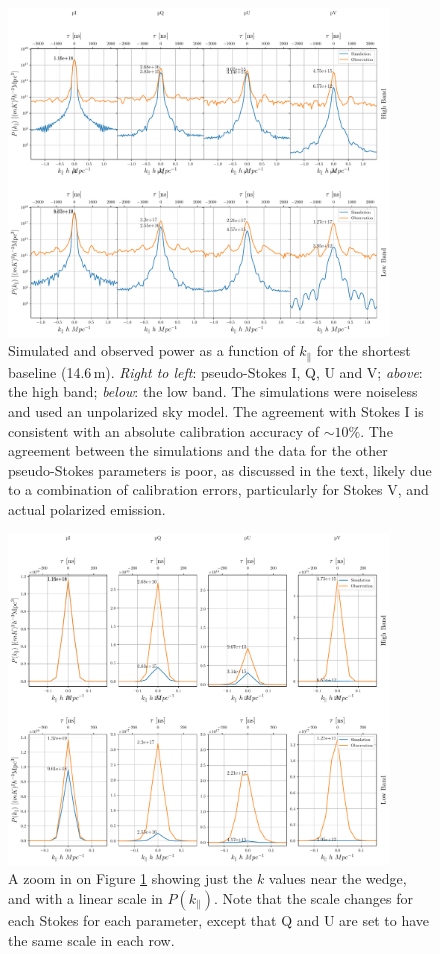 \documentclass[twocolumn, trackchanges]{aastex61}
\begin{document}
\begin{figure}[h]
\centering
\includegraphics[width=0.9\textwidth]{real_sim_compare_noinset.pdf}
\caption{Simulated and observed power as a function of $k_{\parallel}$ for the
  shortest baseline (14.6\,m). \textit{Right to left}: pseudo-Stokes I, Q, U and
  V; \textit{above}: the high band; \textit{below}: the low band. The
  simulations were noiseless and used an unpolarized sky model. The agreement
  with Stokes I is consistent with an absolute calibration accuracy of
  $\sim10\%$.  The agreement between the simulations and the data for the other
  pseudo-Stokes parameters is poor, as discussed in the text, likely due to a
  combination of calibration errors, particularly for Stokes V, and actual
  polarized emission.}
\label{fig:bl0_cuts_vs_sim}
\end{figure}

\begin{figure}[h]
\centering
\includegraphics[width=0.9\textwidth]{ps_peak_zoom.pdf}
\caption{A zoom in on Figure \ref{fig:bl0_cuts_vs_sim} showing just the $k$
  values near the wedge, and with a linear scale in $P(k_\parallel)$.  Note that
  the scale changes for each Stokes for each parameter, except that Q and U are
  set to have the same scale in each row.}
\label{fig:bl0_cuts_vs_sim_zoom}
\end{figure}
\end{document}
